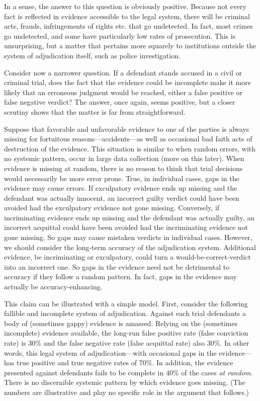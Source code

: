 \documentclass[
  10pt,
  dvipsnames,enabledeprecatedfontcommands]{scrartcl}
\begin{document}
In a sense, the answer to this question is obviously positive. Because
not every fact is reflected in evidence accessible to the legal system,
there will be criminal acts, frauds, infringements of rights etc. that
go undetected. In fact, most crimes go undetected, and some have
particularly low rates of prosecution. This is unsurprising, but a
matter that pertains more squarely to institutions outside the system of
adjudication itself, such as police investigation.

Consider now a narrower question. If a defendant stands accused in a
civil or criminal trial, does the fact that the evidence could be
incomplete make it more likely that an erroneous judgment would be
reached, either a false positive or false negative verdict? The answer,
once again, seems positive, but a closer scrutiny shows that the matter
is far from straightforward.

Suppose that favorable and unfavorable evidence to one of the parties is
always missing for fortuitous reasons---accidents---as well as
occasional bad faith acts of destruction of the evidence. This situation
is similar to when random errors, with no systemic pattern, occur in
large data collection (more on this later). When evidence is missing at
random, there is no reason to think that trial decisions would
necessarily be more error prone. True, in individual cases, gaps in the
evidence may cause errors. If exculpatory evidence ends up missing and
the defendant was actually innocent, an incorrect guilty verdict could
have been avoided had the exculpatory evidence not gone missing.
Conversely, if incriminating evidence ends up missing and the defendant
was actually guilty, an incorrect acquittal could have been avoided had
the incriminating evidence not gone missing. So gaps may cause mistaken
verdicts in individual cases. However, we should consider the long-term
accuracy of the adjudication system. Additional evidence, be
incriminating or exculpatory, could turn a would-be-correct-verdict into
an incorrect one. So gaps in the evidence need not be detrimental to
accuracy if they follow a random pattern. In fact, gaps in the evidence
may actually be accuracy-enhancing.

This claim can be illustrated with a simple model. First, consider the
following fallible and incomplete system of adjudication. Against each
trial defendants a body of (sometimes gappy) evidence is amassed.
Relying on the (sometimes incomplete) evidence available, the long-run
false positive rate (false conviction rate) is 30\% and the false
negative rate (false acquittal rate) also 30\%. In other words, this
legal system of adjudication---with occasional gaps in the
evidence---has true positive and true negative rates of 70\%. In
addition, the evidence presented against defendants fails to be complete
in 40\% of the cases \emph{at random}. There is no discernible systemic
pattern by which evidence goes missing. (The numbers are illustrative
and play no specific role in the argument that follows.)
\end{document}
